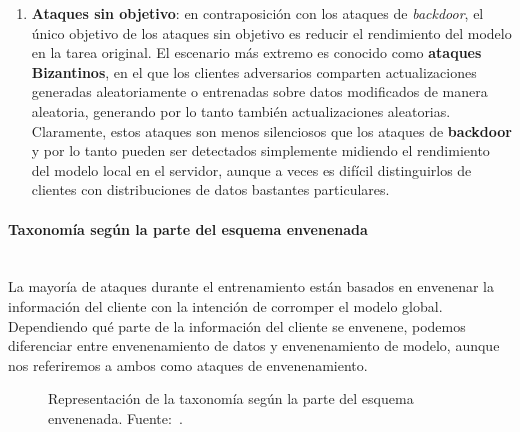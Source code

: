 \begin{enumerate}
\begin{itemize}
    \end{itemize}


    \item \textbf{Ataques sin objetivo}: en contraposición con los ataques de \textit{backdoor}, el único objetivo de los ataques sin objetivo es reducir el rendimiento del modelo en la tarea original. El escenario más extremo es conocido como \textbf{ataques Bizantinos}, en el que los clientes adversarios comparten actualizaciones generadas aleatoriamente o entrenadas sobre datos modificados de manera aleatoria, generando por lo tanto también actualizaciones aleatorias. Claramente, estos ataques son menos silenciosos que los ataques de \textbf{backdoor} y por lo tanto pueden ser detectados simplemente midiendo el rendimiento del modelo local en el servidor, aunque a veces es difícil distinguirlos de clientes con distribuciones de datos bastantes particulares.
\end{enumerate}


\paragraph{Taxonomía según la parte del esquema envenenada}\mbox{}\\
La mayoría de ataques durante el entrenamiento están basados en envenenar la información del cliente con la intención de corromper el modelo global. Dependiendo qué parte de la información del cliente se envenene, podemos diferenciar entre envenenamiento de datos y envenenamiento de modelo, aunque nos referiremos a ambos como ataques de envenenamiento.
\begin{figure}[h!]
    \centering
    
    \caption{Representación de la taxonomía según la parte del esquema envenenada. Fuente:~\cite{survey-nuria-2023}.}
    \label{fig:poisoned}
\end{figure}

